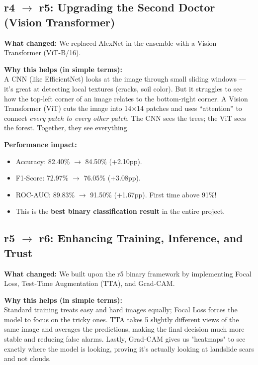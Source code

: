 \documentclass[11pt]{article}
\begin{document}
\subsection{r4 $\to$ r5: Upgrading the Second Doctor (Vision Transformer)}

\textbf{What changed:} We replaced AlexNet in the ensemble with a Vision Transformer (ViT-B/16).

\textbf{Why this helps (in simple terms):}\\
A CNN (like EfficientNet) looks at the image through small sliding windows --- it's great at detecting local textures (cracks, soil color). But it struggles to see how the top-left corner of an image relates to the bottom-right corner. A Vision Transformer (ViT) cuts the image into 14$\times$14 patches and uses ``attention'' to connect \emph{every patch to every other patch}. The CNN sees the trees; the ViT sees the forest. Together, they see everything.

\textbf{Performance impact:}
\begin{itemize}[nosep]
    \item Accuracy: 82.40\% $\to$ 84.50\% (+2.10pp).
    \item F1-Score: 72.97\% $\to$ 76.05\% (+3.08pp).
    \item ROC-AUC: 89.83\% $\to$ 91.50\% (+1.67pp). First time above 91\%!
    \item This is the \textbf{best binary classification result} in the entire project.
\end{itemize}


\subsection{r5 $\to$ r6: Enhancing Training, Inference, and Trust}

\textbf{What changed:} We built upon the r5 binary framework by implementing Focal Loss, Test-Time Augmentation (TTA), and Grad-CAM.

\textbf{Why this helps (in simple terms):}\\
Standard training treats easy and hard images equally; Focal Loss forces the model to focus on the tricky ones. TTA takes 5 slightly different views of the same image and averages the predictions, making the final decision much more stable and reducing false alarms. Lastly, Grad-CAM gives us "heatmaps" to see exactly where the model is looking, proving it's actually looking at landslide scars and not clouds.
\end{document}
